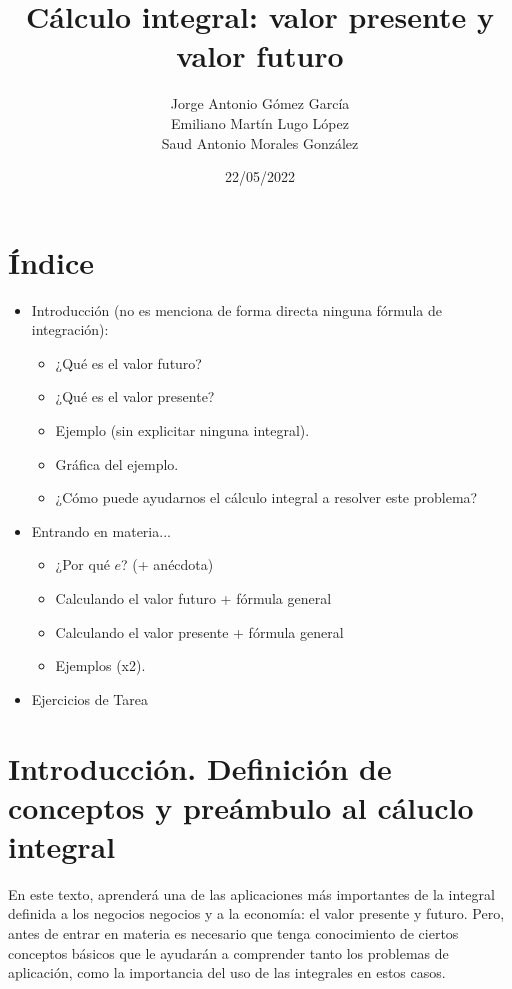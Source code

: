 \documentclass{article}
\title{Cálculo integral: valor presente y valor futuro}
\author{
    Jorge Antonio Gómez García \\
    Emiliano Martín Lugo López \\
    Saud Antonio Morales González}
\date{22/05/2022}
\begin{document}
\maketitle

\section*{Índice}
    \begin{itemize}

        \item Introducción (no es menciona de forma directa ninguna fórmula de integración): \begin{itemize}
            \item ¿Qué es el valor futuro?
            \item ¿Qué es el valor presente?
            \item Ejemplo (sin explicitar ninguna integral).
            \item Gráfica del ejemplo.
            \item ¿Cómo puede ayudarnos el cálculo integral a resolver este problema?
        \end{itemize}

        \item Entrando en materia... \begin{itemize}
            \item ¿Por qué $e$? (+ anécdota)
            \item Calculando el valor futuro + fórmula general
            \item Calculando el valor presente + fórmula general
            \item Ejemplos (x2).
        \end{itemize}

        \item Ejercicios de Tarea
        
    \end{itemize}

    \section{Introducción. Definición de conceptos y preámbulo al cáluclo integral}

        En este texto, aprenderá una de las aplicaciones más importantes de la integral definida a los negocios negocios y a la economía: el valor presente y futuro. Pero, antes de entrar en materia es necesario que tenga conocimiento de ciertos conceptos básicos que le ayudarán a comprender tanto los problemas de aplicación, como la importancia del uso de las integrales en estos casos.
\end{document}
